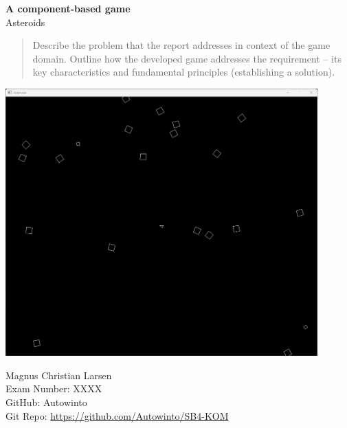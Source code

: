 \begin{titlepage}
    \begin{center}
        \vspace*{1cm}
        \Huge
        \textbf{A component-based game}
        \vspace{0.5cm} \\
        \LARGE
        Asteroids
        \begin{abstract}
            Describe the problem that the report addresses in context of the 
            game domain.
            Outline how the developed game addresses the requirement – its key 
            characteristics and fundamental principles 
            (establishing a solution).

        \end{abstract}
        \includegraphics[width=12cm]{images/Asteroids}
    \end{center}

    \begin{center}
        Magnus Christian Larsen\\
        Exam Number: XXXX\\
        GitHub: Autowinto\\
        Git Repo: \url{https://github.com/Autowinto/SB4-KOM}\\
    \end{center}
\end{titlepage}